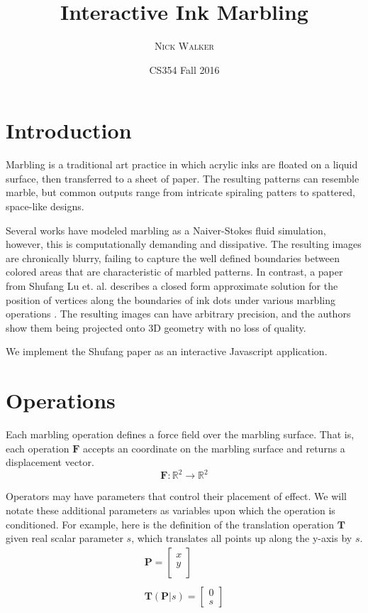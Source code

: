 \documentclass{article}
\title{Interactive Ink Marbling}
\author{\textsc{Nick Walker}}
\date{CS354 Fall 2016} %
\newcommand{\Fb}{\boldsymbol{F}}
\newcommand{\Pb}{\boldsymbol{P}}
\newcommand{\Tb}{\boldsymbol{T}}
\begin{document}
\twocolumn	
\maketitle %


\section{Introduction}

Marbling is a traditional art practice in which acrylic inks are floated on a liquid surface, then transferred to a sheet of paper. The resulting patterns can resemble marble, but common outputs range from intricate spiraling patters to spattered, space-like designs.

Several works have modeled marbling as a Naiver-Stokes fluid simulation, however, this is computationally demanding and dissipative. The resulting images are chronically blurry, failing to capture the well defined boundaries between colored areas that are characteristic of marbled patterns. In contrast, a paper from Shufang Lu et. al. describes a closed form approximate solution for the position of vertices along the boundaries of ink
dots under various marbling operations \cite{Shufang2012}. The resulting images can have arbitrary precision, and the authors show them being projected onto 3D geometry with no loss of quality.

We implement the Shufang paper as an interactive Javascript application.

\section{Operations}

Each marbling operation defines a force field over the marbling surface. That is, each operation $\Fb$ accepts an coordinate on the marbling surface and returns a displacement vector.
\begin{equation*}
		\Fb: \mathbb{R}^2 \rightarrow \mathbb{R}^2
\end{equation*}

Operators may have parameters that control their placement of effect. We will notate these additional parameters as variables upon which the operation is conditioned. For example, here is the definition of the translation operation $\Tb$ given real scalar parameter $s$, which translates all points up along the y-axis by $s$. 
\begin{gather*}
			\Pb = \begin{bmatrix}
	x \\
	y\\
	\end{bmatrix}\\
	\\
	\Tb(\Pb | s) = \begin{bmatrix}
	0 \\
	s
	\end{bmatrix}
\end{gather*}
\end{document}

